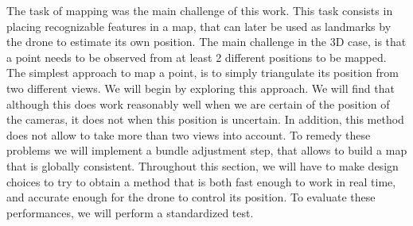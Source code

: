 The task of mapping was the main challenge of this work. This task consists in placing recognizable features in a map, that can later be used as landmarks by the drone to estimate its own position. The main challenge in the 3D case, is that a point needs to be observed from at least 2 different positions to be mapped. The simplest approach to map a point, is to simply triangulate its position from two different views. We will begin by exploring this approach. We will find that although this does work reasonably well when we are certain of the position of the cameras, it does not when this position is uncertain. In addition, this method does not allow to take more than two views into account. To remedy these problems we will implement a bundle adjustment step, that allows to build a map that is globally consistent. Throughout this section, we will have to make design choices to try to obtain a method that is both fast enough to work in real time, and accurate enough for the drone to control its position. To evaluate these performances, we will perform a standardized test.


